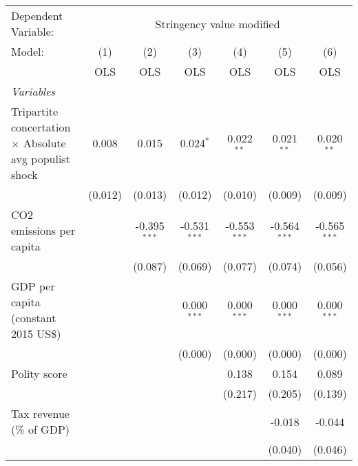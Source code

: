 
\begingroup
\centering
\begin{tabular}{lcccccc}
   \toprule
   Dependent Variable: & \multicolumn{6}{c}{Stringency value modified}\\
   Model:                                                        & (1)     & (2)            & (3)            & (4)            & (5)            & (6)\\  
                                                                 &  OLS    & OLS            & OLS            & OLS            & OLS            & OLS\\  
   \midrule
   \emph{Variables}\\
   Tripartite concertation $\times$ Absolute avg populist shock  & 0.008   & 0.015          & 0.024$^{*}$    & 0.022$^{**}$   & 0.021$^{**}$   & 0.020$^{**}$\\   
                                                                 & (0.012) & (0.013)        & (0.012)        & (0.010)        & (0.009)        & (0.009)\\   
   CO2 emissions per capita                                      &         & -0.395$^{***}$ & -0.531$^{***}$ & -0.553$^{***}$ & -0.564$^{***}$ & -0.565$^{***}$\\   
                                                                 &         & (0.087)        & (0.069)        & (0.077)        & (0.074)        & (0.056)\\   
   GDP per capita (constant 2015 US\$)                           &         &                & 0.000$^{***}$  & 0.000$^{***}$  & 0.000$^{***}$  & 0.000$^{***}$\\   
                                                                 &         &                & (0.000)        & (0.000)        & (0.000)        & (0.000)\\   
   Polity score                                                  &         &                &                & 0.138          & 0.154          & 0.089\\   
                                                                 &         &                &                & (0.217)        & (0.205)        & (0.139)\\   
   Tax revenue (\% of GDP)                                       &         &                &                &                & -0.018         & -0.044\\   
                                                                 &         &                &                &                & (0.040)        & (0.046)\\   

\end{tabular}
